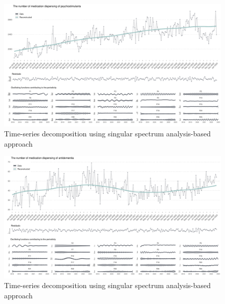 \documentclass[
  letterpaper,
  DIV=11,
  numbers=noendperiod]{scrartcl}
\begin{document}
\begin{figure}[H]

{\centering \includegraphics[width=1\linewidth,height=\textheight,keepaspectratio]{supplementary_files/figure-pdf/unnamed-chunk-2-17.pdf}

}

\caption{Time-series decomposition using singular spectrum
analysis-based approach}

\end{figure}%

\begin{figure}[H]

{\centering \includegraphics[width=1\linewidth,height=\textheight,keepaspectratio]{supplementary_files/figure-pdf/unnamed-chunk-2-18.pdf}

}

\caption{Time-series decomposition using singular spectrum
analysis-based approach}

\end{figure}%
\end{document}
